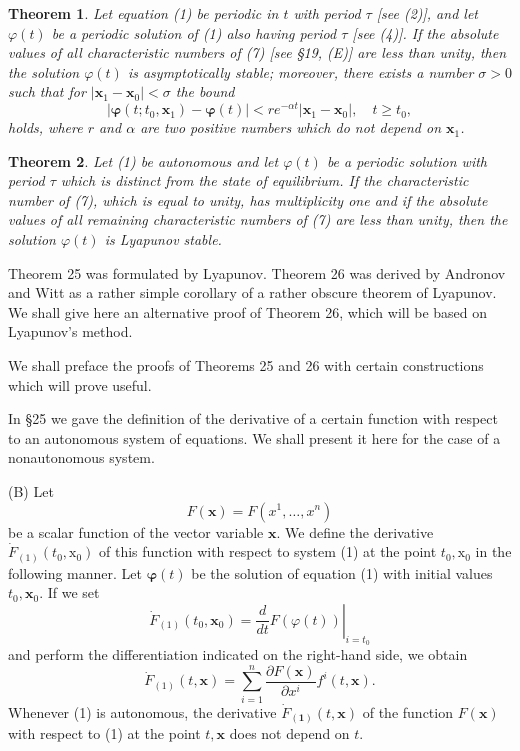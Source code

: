 \documentclass[10pt,a5paper]{book}
\theoremstyle{plain}
\newtheorem{theorem}{Theorem}
\theoremstyle{definition}
\theoremstyle{remark}
\begin{document}
\begin{theorem}
Let equation (1) be periodic in $t$ with period $\tau$ [see (2)], and let $\varphi(t)$ be a periodic solution of (1) also having period $\tau$ [see (4)]. If the absolute values of all characteristic numbers of (7) [see §19, (E)] are less than unity, then the solution $\varphi(t)$ is asymptotically stable; moreover, there exists a number $\sigma>0$ such that for $\left|\mathbf{x}_{1}-\mathbf{x}_{0}\right|<\sigma$ the bound
\begin{equation*}
\left|\boldsymbol{\varphi}\left(t ; t_{0}, \mathbf{x}_{1}\right)-\boldsymbol{\varphi}(t)\right|<r e^{-\alpha t}\left|\mathbf{x}_{1}-\mathbf{x}_{0}\right|, \quad t \geq t_{0}, \tag{12}
\end{equation*}
holds, where $r$ and $\alpha$ are two positive numbers which do not depend on $\mathbf{x}_{1}$.
\end{theorem}
\begin{theorem}
Let (1) be autonomous and let $\varphi(t)$ be a periodic solution with period $\tau$ which is distinct from the state of equilibrium. If the characteristic number of (7), which is equal to unity, has multiplicity one and if the absolute values of all remaining characteristic numbers of (7) are less than unity, then the solution $\varphi(t)$ is Lyapunov stable.
\end{theorem}

Theorem 25 was formulated by Lyapunov. Theorem 26 was derived by Andronov and Witt as a rather simple corollary of a rather obscure theorem of Lyapunov. We shall give here an alternative proof of Theorem 26, which will be based on Lyapunov's method.

We shall preface the proofs of Theorems 25 and 26 with certain constructions which will prove useful.

In §25 we gave the definition of the derivative of a certain function with respect to an autonomous system of equations. We shall present it here for the case of a nonautonomous system.

(B) Let
\[
F(\mathbf{x})=F\left(x^{1}, \ldots, x^{n}\right)
\]
be a scalar function of the vector variable $\mathbf{x}$. We define the derivative
$\dot{F}_{(1)}\left(t_{0}, \mathrm{x}_{0}\right)$ of this function with respect to system (1) at the point $t_{0}, \mathrm{x}_{0}$ in the following manner. Let $\boldsymbol{\varphi}(t)$ be the solution of equation (1) with initial values $t_{0}, \mathbf{x}_{0}$. If we set
\[
\dot{F}_{(1)}\left(t_{0}, \mathbf{x}_{0}\right)=\left.\frac{d}{d t} F(\varphi(t))\right|_{i=t_{0}}
\]
and perform the differentiation indicated on the right-hand side, we obtain
\[
\dot{F}_{(1)}(t, \mathbf{x})=\sum_{i=1}^{n} \frac{\partial F(\mathbf{x})}{\partial x^{i}} f^{i}(t, \mathbf{x}) .
\]
Whenever (1) is autonomous, the derivative $\dot{F}_{(\mathbf{1})}(t, \mathbf{x})$ of the function $F(\mathbf{x})$ with respect to (1) at the point $t, \mathbf{x}$ does not depend on $t$.
\end{document}
